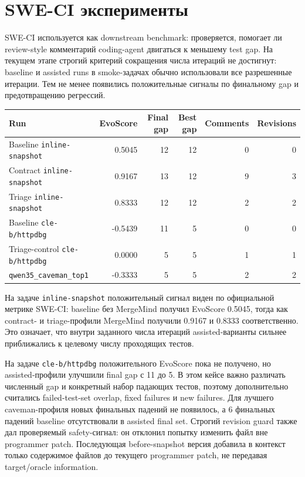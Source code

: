 \documentclass[14pt,a4paper]{extreport}
\begin{document}
\section{SWE-CI эксперименты}

SWE-CI используется как downstream benchmark: проверяется, помогает ли
review-style комментарий coding-agent двигаться к меньшему test gap. На текущем
этапе строгий критерий сокращения числа итераций не достигнут: baseline и
assisted runs в smoke-задачах обычно использовали все разрешенные итерации.
Тем не менее появились положительные сигналы по финальному gap и предотвращению
регрессий.

\begin{center}
\begin{tabular}{p{}rrrrr}
  \toprule
  Run & EvoScore & Final gap & Best gap & Comments & Revisions \\
  \midrule
  Baseline \texttt{inline-snapshot} & 0.5045 & 12 & 12 & 0 & 0 \\
  Contract \texttt{inline-snapshot} & 0.9167 & 13 & 12 & 9 & 3 \\
  Triage \texttt{inline-snapshot} & 0.8333 & 12 & 12 & 2 & 2 \\
  Baseline \texttt{cle-b/httpdbg} & -0.5439 & 11 & 5 & 0 & 0 \\
  Triage-control \texttt{cle-b/httpdbg} & 0.0000 & 5 & 5 & 1 & 1 \\
  \texttt{qwen35\_caveman\_top1} & -0.3333 & 5 & 5 & 2 & 2 \\
  \bottomrule
\end{tabular}
\end{center}

На задаче \texttt{inline-snapshot} положительный сигнал виден по официальной
метрике SWE-CI: baseline без MergeMind получил EvoScore 0.5045, тогда как
contract- и triage-профили MergeMind получили 0.9167 и 0.8333 соответственно.
Это означает, что внутри заданного числа итераций assisted-варианты сильнее
приближались к целевому числу проходящих тестов.

На задаче \texttt{cle-b/httpdbg} положительного EvoScore пока не получено, но
assisted-профили улучшили final gap с 11 до 5. В этом кейсе важно различать
численный gap и конкретный набор падающих тестов, поэтому дополнительно
считались failed-test-set overlap, fixed failures и new failures. Для лучшего
caveman-профиля новых финальных падений не появилось, а 6 финальных падений
baseline отсутствовали в assisted final set. Строгий revision guard также дал
проверяемый safety-сигнал: он отклонил попытку изменить файл вне programmer
patch. Последующая before-snapshot версия добавила в контекст только содержимое
файлов до текущего programmer patch, не передавая target/oracle information.
\end{document}
